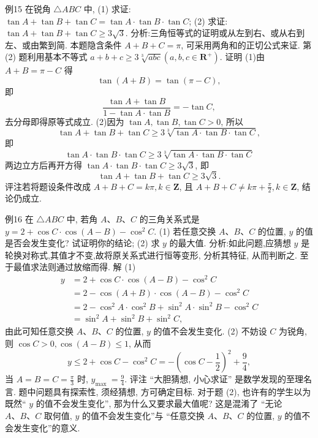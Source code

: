 例15 在锐角 $\triangle A B C$ 中,
(1) 求证: $\tan A+\tan B+\tan C=\tan A \cdot \tan B \cdot \tan C$;
(2) 求证: $\tan A+\tan B+\tan C \geqslant 3 \sqrt{3}$.
分析:三角恒等式的证明或从左到右、或从右到左、或由繁到简.
本题隐含条件 $A+B+C=\pi$, 可采用两角和的正切公式来证.
第(2) 题利用基本不等式 $a+b+c \geqslant 3 \sqrt[3]{a b c}\left(a, b, c \in \mathbf{R}^{+}\right)$.
证明 (1)由 $A+B=\pi-C$ 得
$$
\tan (A+B)=\tan (\pi-C),
$$
即
$$
\frac{\tan A+\tan B}{1-\tan A \cdot \tan B}=-\tan C,
$$
去分母即得原等式成立.
(2)因为 $\tan A, \tan B, \tan C>0$, 所以
$$
\tan A+\tan B+\tan C \geqslant 3 \sqrt[3]{\tan A \cdot \tan B \cdot \tan C},
$$
即
$$
\tan A \cdot \tan B \cdot \tan C \geqslant 3 \sqrt[3]{\tan A \cdot \tan B \cdot \tan C}
$$
两边立方后再开方得 $\tan A \cdot \tan B \cdot \tan C \geqslant 3 \sqrt{3}$, 即
$$
\tan A+\tan B+\tan C \geqslant 3 \sqrt{3} .
$$
评注若将题设条件改成 $A+B+C=k \pi, k \in \mathbf{Z}$, 且 $A+B+C \neq k \pi+ \frac{\pi}{2}, k \in \mathbf{Z}$, 结论仍成立.



例16 在 $\triangle A B C$ 中, 若角 $A 、 B 、 C$ 的三角关系式是 $y=2+\cos C \cdot \cos (A-B)-\cos ^2 C$.
(1) 若任意交换 $A 、 B 、 C$ 的位置, $y$ 的值是否会发生变化? 试证明你的结论;
(2) 求 $y$ 的最大值.
分析:如此问题,应猜想 $y$ 是轮换对称式,其值才不变,故将原关系式进行恒等变形, 分析其特征, 从而判断之.
至于最值求法则通过放缩而得.
解 (1)
$$
\begin{aligned}
y & =2+\cos C \cdot \cos (A-B)-\cos ^2 C \\
& =2-\cos (A+B) \cdot \cos (A-B)-\cos ^2 C \\
& =2-\cos ^2 A \cdot \cos ^2 B+\sin ^2 A \cdot \sin ^2 B-\cos ^2 C \\
& =\sin ^2 A+\sin ^2 B+\sin ^2 C,
\end{aligned}
$$
由此可知任意交换 $A 、 B 、 C$ 的位置, $y$ 的值不会发生变化.
(2) 不妨设 $C$ 为锐角, 则 $\cos C>0, \cos (A-B) \leqslant 1$, 从而
$$
y \leqslant 2+\cos C-\cos ^2 C=-\left(\cos C-\frac{1}{2}\right)^2+\frac{9}{4},
$$
当 $A=B=C=\frac{\pi}{3}$ 时, $y_{\text {max }}=\frac{9}{4}$.
评注 “大胆猜想, 小心求证” 是数学发现的至理名言.
题中问题具有探索性, 须经猜想, 方可确定目标.
对于题 (2), 也许有的学生以为既然“ $y$ 的值不会发生变化”, 那为什么又要求最大值呢? 这是混淆了 “无论 $A 、 B 、 C$ 取何值, $y$ 的值不会发生变化”与 “任意交换 $A 、 B 、 C$ 的位置, $y$ 的值不会发生变化”的意义.



